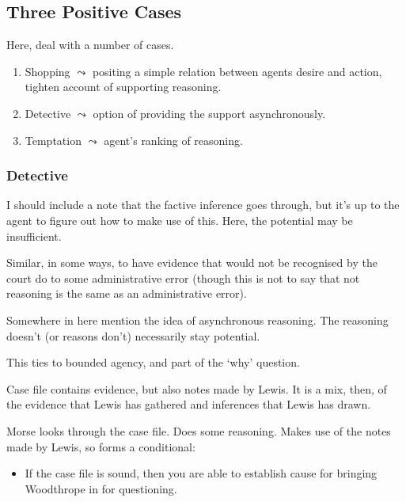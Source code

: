 \documentclass[10pt]{article}
\begin{document}
\subsection{Three Positive Cases}
\label{sec:positive-cases}

\begin{note}[Cases]
  Here, deal with a number of cases.
  \begin{enumerate}
  \item Shopping \(\leadsto\) positing a simple relation between agents desire and action, tighten account of supporting reasoning.
  \item Detective \(\leadsto\) option of providing the support asynchronously.
  \item Temptation \(\leadsto\) agent's ranking of reasoning.
  \end{enumerate}
\end{note}


\subsubsection{Detective}
\label{sec:detective}

\begin{note}
  I should include a note that the factive inference goes through, but it's up to the agent to figure out how to make use of this.
  Here, the potential may be insufficient.

  Similar, in some ways, to have evidence that would not be recognised by the court do to some administrative error (though this is not to say that not reasoning is the same as an administrative error).
\end{note}

\begin{note}[Async]
  Somewhere in here mention the idea of asynchronous reasoning.
  The reasoning doesn't (or reasons don't) necessarily stay potential.

  This ties to bounded agency, and part of the `why' question.
\end{note}

\begin{scenario}
  Case file contains evidence, but also notes made by Lewis.
  It is a mix, then, of the evidence that Lewis has gathered and inferences that Lewis has drawn.

  Morse looks through the case file.
  Does some reasoning.
  Makes use of the notes made by Lewis, so forms a conditional:

  \begin{itemize}
  \item If the case file is sound, then you are able to establish cause for bringing Woodthrope in for questioning.
  \end{itemize}

\end{scenario}
\end{document}
